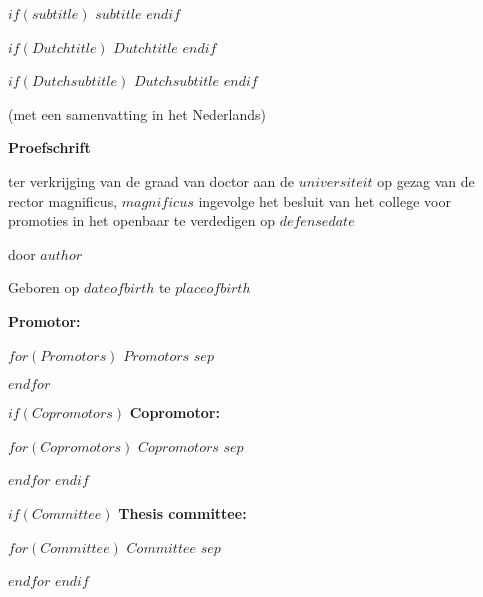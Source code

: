 \documentclass[$for(classoption)$$classoption$$sep$,$endfor$,twoside,openright]{book}
\begin{document}
\begin{titlepage}
\begin{center}
        $if(subtitle)$
        \Large
        $subtitle$
        $endif$

        $if(Dutchtitle)$
        \vspace{1cm}
        \LARGE
        $Dutchtitle$
        $endif$

        $if(Dutchsubtitle)$
        \large
        $Dutchsubtitle$
        $endif$

        (met een samenvatting in het Nederlands)

        \vfill
        \LARGE
        \textbf{Proefschrift}

        \vfill

        \large
        ter verkrijging van de graad van doctor aan de $universiteit$ op gezag van
        de rector magnificus, $magnificus$ ingevolge het besluit van het college
        voor promoties in het openbaar te verdedigen op $defensedate$

        \vfill
        door
        \vfill
        \LARGE
        \textbf{$author$}
        \vspace{.5cm}

        \normalsize
        Geboren op $dateofbirth$ te $placeofbirth$

          \vspace{.5cm}


    \end{center}
    \newpage

    \normalsize
    \begin{spacing}{0}
    \textbf{Promotor:}

    $for(Promotors)$
        \hspace{.5cm}
        $Promotors$
        $sep$

    $endfor$

    \vspace{.5cm}

    $if(Copromotors)$
        \textbf{Copromotor:}

        $for(Copromotors)$
            \hspace{.5cm}
            $Copromotors$
            $sep$

        $endfor$
    $endif$

    $if(Committee)$
        \textbf{Thesis committee:}

        $for(Committee)$
            \hspace{.5cm}
            $Committee$
            $sep$

        $endfor$
    $endif$
    \end{spacing}
\end{titlepage}
\end{document}
